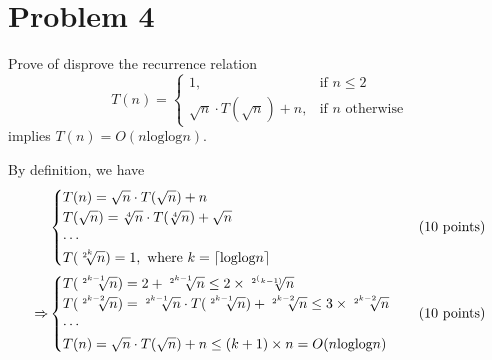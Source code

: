 \documentclass[a4paper]{article}
\DeclarePairedDelimiter{\ceil}{\lceil}{\rceil}
\begin{document}
\section{Problem 4}

Prove of disprove the recurrence relation
\begin{equation*}
T(n) = \begin{cases} 1, & \mbox{if } n \leq 2 \\ \sqrt{n} \cdot T(\sqrt{n}) + n, & \mbox{if } n\mbox{ otherwise} \end{cases} 
\end{equation*}
implies $T(n) = O(n\text{loglog}n)$.

By definition, we have
\begin{align*}
&
\begin{cases} 
T(n) = \sqrt{n} \cdot T(\sqrt{n}) + n \\ 
T(\sqrt{n}) = \sqrt[4]{n} \cdot T(\sqrt[4]{n}) + \sqrt{n}  \\ 
\cdots \\
T(\sqrt[2^k]{n}) = 1,\text{ where }k = \ceil{\text{loglog}n}
\end{cases}
&\text{(10 points)} \\
\Rightarrow
&
\begin{cases} 
T(\sqrt[2^{k-1}]{n}) = 2 + \sqrt[2^{k-1}]{n} \leq 2\times \sqrt[2^(k-1)]{n} \\ 
T(\sqrt[2^{k-2}]{n}) = \sqrt[2^{k-1}]{n} \cdot T(\sqrt[2^{k-1}]{n}) + \sqrt[2^{k-2}]{n} \leq 3\times \sqrt[2^{k-2}]{n}  \\ 
\cdots \\
T(n) = \sqrt{n} \cdot T(\sqrt{n}) + n \leq (k+1)\times n = O(n\text{loglog}n)
\end{cases}
&\text{(10 points)}
\end{align*}
\end{document}
